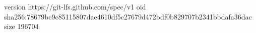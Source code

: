 version https://git-lfs.github.com/spec/v1
oid sha256:78679bc9c85115807dae4610df5c27679d472bdf0b829707b2341bbdafa36dac
size 196704
